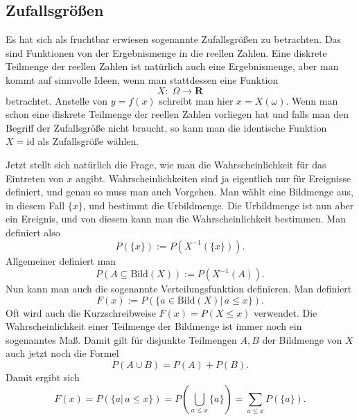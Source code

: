 \documentclass[a4paper,10pt,fleqn,twocolumn,twoside]{article}
\numberwithin{equation}{section}
\begin{document}
\subsection{Zufallsgrößen}

Es hat sich als fruchtbar erwiesen sogenannte Zufallsgrößen zu
betrachten. Das sind Funktionen von der Ergebnismenge in die reellen
Zahlen. Eine diskrete Teilmenge der reellen Zahlen ist natürlich auch
eine Ergebnismenge, aber man kommt auf sinnvolle Ideen, wenn man
stattdessen eine Funktion
\begin{equation}
X{:}\;\Omega\rightarrow\mathbf R
\end{equation}
betrachtet. Anstelle von $y=f(x)$ schreibt man hier $x=X(\omega)$.
Wenn man schon eine diskrete Teilmenge der reellen Zahlen vorliegen
hat und falls man den Begriff der Zufallsgröße nicht braucht, so kann
man die identische Funktion $X=\mathrm{id}$ als Zufallsgröße wählen.

Jetzt stellt sich natürlich die Frage, wie man die
Wahrscheinlichkeit für das Eintreten von $x$ angibt.
Wahrscheinlichkeiten sind ja eigentlich nur für Ereignisse definiert,
und genau so muss man auch Vorgehen. Man wählt eine Bildmenge aus,
in diesem Fall $\{x\}$, und bestimmt die Urbildmenge.
Die Urbildmenge ist nun aber ein Ereignis, und von diesem kann man
die Wahrscheinlichkeit bestimmen. Man definiert also
\begin{equation}
P(\{x\}) := P(X^{-1}(\{x\})).
\end{equation}
Allgemeiner definiert man
\begin{equation}
P(A\subseteq \mathrm{Bild}(X)) := P(X^{-1}(A)).
\end{equation}
Nun kann man auch die sogenannte Verteilungsfunktion definieren.
Man definiert
\begin{equation}
F(x) := P(\{a{\in}\mathrm{Bild}(X)|\,a\le x\}).
\end{equation}
Oft wird auch die Kurzschreibweise $F(x)=P(X\le x)$ verwendet.
Die Wahrscheinlichkeit einer Teilmenge der Bildmenge ist immer noch
ein sogenanntes Maß. Damit gilt für disjunkte Teilmengen $A,B$
der Bildmenge von $X$ auch jetzt noch die Formel
\begin{equation}
P(A\cup B) = P(A)+P(B).
\end{equation}
Damit ergibt sich
\[F(x) = P(\{a|\,a\le x\})
= P(\bigcup_{a\le x}\{a\}) = \sum_{a\le x} P(\{a\}).\]
\end{document}
